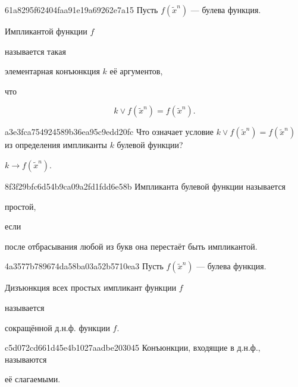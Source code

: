\begin{note}{61a8295f62404faa91e19a69262e7a15}
    Пусть \({ f(\widetilde x^{n}) }\) --- булева функция.
    \begin{icloze}{3}Импликантой функции \({ f }\)\end{icloze} называется такая \begin{icloze}{2}элементарная конъюнкция \({ k }\) её аргументов,\end{icloze} что
    \begin{icloze}{1}
        \[
            k \lor f(\widetilde x^{n}) = f(\widetilde x^{n}).
        \]
    \end{icloze}
\end{note}

\begin{note}{a3e3fca754924589b36ea95c9edd20fc}
    Что означает условие \({ k \lor f(\widetilde x^{n}) = f(\widetilde x^{n}) }\) из определения импликанты \({ k }\) булевой функции?

    \begin{cloze}{1}
        \({ k \to f(\widetilde x^{n}) }\).
    \end{cloze}
\end{note}

\begin{note}{8f3f29bfc6d54b9ca09a2fd1fdd6e58b}
    Импликанта булевой функции называется \begin{icloze}{2}простой,\end{icloze} если \begin{icloze}{1}после отбрасывания любой из букв она перестаёт быть импликантой.\end{icloze}
\end{note}

\begin{note}{4a3577b789674da58ba03a52b5710ea3}
    Пусть \({ f(\widetilde x^{n}) }\) --- булева функция.
    \begin{icloze}{2}Дизъюнкция всех простых импликант функции \({ f }\)\end{icloze} называется \begin{icloze}{1}сокращённой д.н.ф. функции \({ f }\).\end{icloze}
\end{note}

\begin{note}{c5d072cd661d45e4b1027aadbe203045}
    Конъюнкции, входящие в д.н.ф., называются \begin{icloze}{1}её слагаемыми.\end{icloze}
\end{note}

